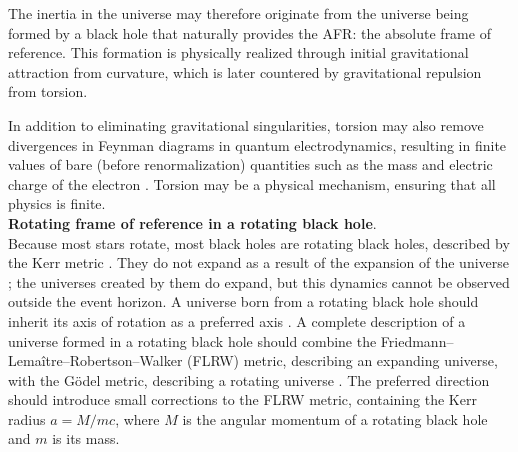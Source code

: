 \documentclass[prd,onecolumn,nofootinbib]{revtex4}
\begin{document}
The inertia in the universe may therefore originate from the universe being formed by a black hole that naturally provides the AFR: the absolute frame of reference.
This formation is physically realized through initial gravitational attraction from curvature, which is later countered by gravitational repulsion from torsion.

In addition to eliminating gravitational singularities, torsion may also remove divergences in Feynman diagrams in quantum electrodynamics, resulting in finite values of bare (before renormalization) quantities such as the mass and electric charge of the electron \cite{reg}.
Torsion may be a physical mechanism, ensuring that all physics is finite.\\


\noindent
{\bf Rotating frame of reference in a rotating black hole}.\\
Because most stars rotate, most black holes are rotating black holes, described by the Kerr metric \cite{Kerr}.
They do not expand as a result of the expansion of the universe \cite{exp}; the universes created by them do expand, but this dynamics cannot be observed outside the event horizon.
A universe born from a rotating black hole should inherit its axis of rotation as a preferred axis \cite{cosmo}.
A complete description of a universe formed in a rotating black hole should combine the Friedmann--Lema\^{i}tre--Robertson--Walker (FLRW) metric, describing an expanding universe, with the G\"{o}del metric, describing a rotating universe \cite{rot}.
The preferred direction should introduce small corrections to the FLRW metric, containing the Kerr radius $a=M/mc$, where $M$ is the angular momentum of a rotating black hole and $m$ is its mass.
\end{document}
